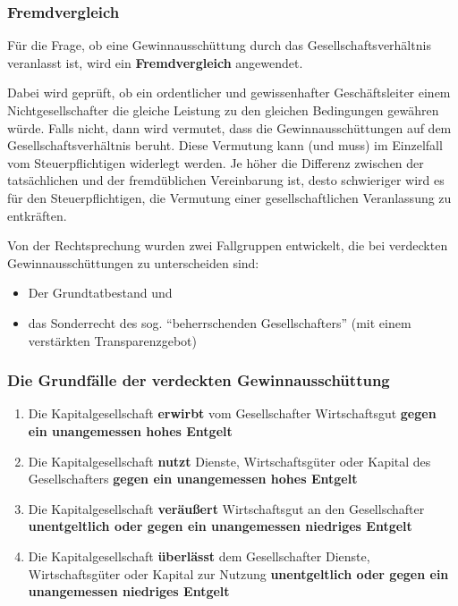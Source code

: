 \documentclass[12pt,A4]{extarticle}
\newcommand{\highlight}[1]{\textcolor{highlightColor}{\textbf{#1}}}
\begin{document}
\subsubsection{Fremdvergleich}
Für die Frage, ob eine Gewinnausschüttung durch das Gesellschaftsverhältnis veranlasst ist, wird ein \highlight{Fremdvergleich} angewendet.\par
Dabei wird geprüft, ob ein ordentlicher und gewissenhafter Geschäftsleiter einem Nichtgesellschafter die gleiche Leistung zu den gleichen Bedingungen gewähren würde. Falls nicht, dann wird vermutet, dass die Gewinnausschüttungen auf dem Gesellschaftsverhältnis beruht. Diese Vermutung kann (und muss) im Einzelfall vom Steuerpflichtigen widerlegt werden. Je höher die Differenz zwischen der tatsächlichen und der fremdüblichen Vereinbarung ist, desto schwieriger wird es für den Steuerpflichtigen, die Vermutung einer gesellschaftlichen Veranlassung zu entkräften.\par
Von der Rechtsprechung wurden zwei Fallgruppen entwickelt, die bei verdeckten Gewinnausschüttungen zu unterscheiden sind:
\begin{itemize}
  \item{Der Grundtatbestand und}
  \item{das Sonderrecht des sog. ``beherrschenden Gesellschafters'' (mit einem verstärkten Transparenzgebot)}
\end{itemize}

\subsubsection{Die Grundfälle der verdeckten Gewinnausschüttung}
\begin{enumerate}
  \item{Die Kapitalgesellschaft \textbf{erwirbt} vom Gesellschafter Wirtschaftsgut \textbf{gegen ein unangemessen hohes Entgelt}}
  \item{Die Kapitalgesellschaft \textbf{nutzt} Dienste, Wirtschaftsgüter oder Kapital des Gesellschafters \textbf{gegen ein unangemessen hohes Entgelt}}
  \item{Die Kapitalgesellschaft \textbf{veräußert} Wirtschaftsgut an den Gesellschafter \textbf{unentgeltlich oder gegen ein unangemessen niedriges Entgelt}}
  \item{Die Kapitalgesellschaft  \textbf{überlässt} dem Gesellschafter Dienste, Wirtschaftsgüter oder Kapital zur Nutzung  \textbf{unentgeltlich oder gegen ein unangemessen niedriges Entgelt}}
\end{enumerate}
\end{document}
